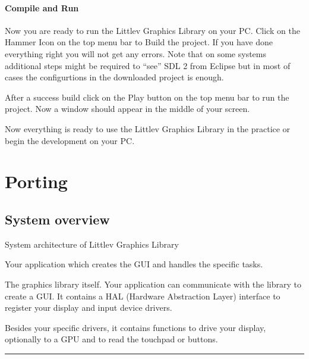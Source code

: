 \documentclass[letterpaper,10pt,english]{sphinxmanual}
\begin{document}
\subsubsection{Compile and Run}
\label{\detokenize{get-started/pc-simulator:compile-and-run}}
Now you are ready to run the Littlev Graphics Library on your PC. Click on the Hammer Icon on the top menu bar to Build the project. If you have done everything right you will not get any errors. Note that on some systems additional steps might be required to “see” SDL 2 from Eclipse but in most of cases the configurtions in the downloaded project is enough.

After a success build click on the Play button on the top menu bar to run the project. Now a window should appear in the middle of your screen.

Now everything is ready to use the Littlev Graphics Library in the practice or begin the development on your PC.


\chapter{Porting}
\label{\detokenize{porting/index::doc}}\label{\detokenize{porting/index:porting}}

\section{System overview}
\label{\detokenize{porting/sys::doc}}\label{\detokenize{porting/sys:system-overview}}
System architecture of Littlev Graphics Library

Your application which creates the GUI and handles the specific tasks.

The graphics library itself. Your application can communicate with the library to create a GUI. It contains a HAL (Hardware Abstraction Layer) interface to register your display and input device drivers.

Besides your specific drivers, it contains functions to drive your display, optionally to a GPU and to read the touchpad or buttons.


\bigskip\hrule\bigskip
\end{document}

